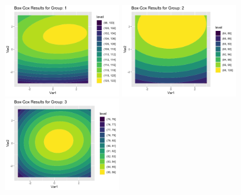 \begin{center}
	\includegraphics[width=2.0in]{I_1_bxcx.png}
	\includegraphics[width=2.0in]{I_2_bxcx.png}
	\includegraphics[width=2.0in]{I_3_bxcx.png}
\end{center}

